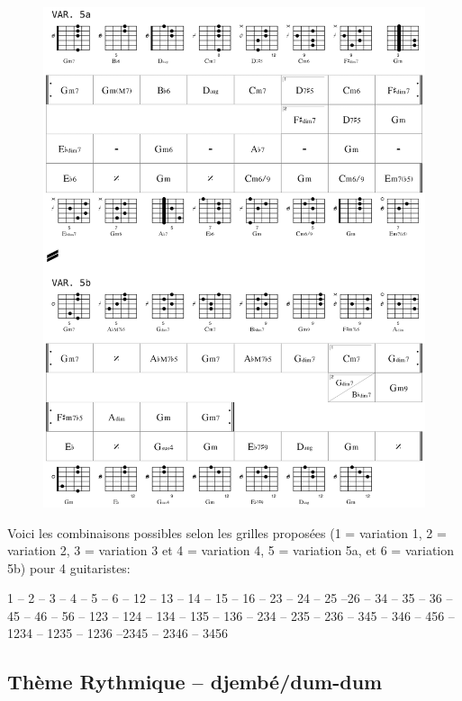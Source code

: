  \begin{figure}[H]
\begin{center}
\includegraphics[scale=0.33]{img/dlc4}
\end{center}
\end{figure}

Voici les combinaisons possibles selon les grilles propos\'{e}es (1 = variation 1, 2 = variation 2, 3 = variation 3 et 4 = variation 4, 5 = variation 5a, et 6 = variation 5b) pour 4 guitaristes: 

1 -- 2 -- 3 -- 4 -- 5 -- 6 -- 12 -- 13 -- 14 -- 15 -- 16 --  23 -- 24 -- 25 --26 -- 34 -- 35 -- 36 -- 45 -- 46 -- 56 -- 123 -- 124 -- 134 -- 135 -- 136 -- 234 -- 235 -- 236 -- 345 -- 346 -- 456 -- 1234 -- 1235 -- 1236 --2345 -- 2346 -- 3456 %
 
\bigskip

\subsection*{Th\`{e}me Rythmique -- djemb\'{e}/dum-dum}

